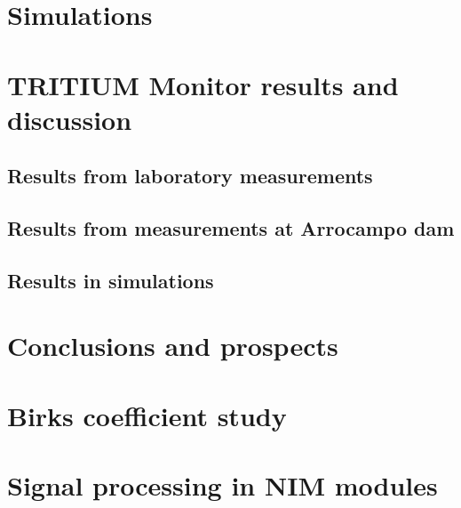 \documentclass[12pt,a4paper]{book}
\begin{document}
\chapter{Simulations}  \label{chap:Simulations}
\newpage
	
\chapter[Results and discussion]{TRITIUM Monitor results and discussion}\label{chap:Results}
	\section{Results from laboratory measurements}
	\newpage
		
	\section[Results in Arrocampo dam]{Results from measurements at Arrocampo dam}
	\newpage
	
	\section{Results in simulations}
	\newpage		

\chapter{Conclusions and prospects}  \label{chap:Conclusions}

\newpage


\appendix
\appendixpage
\noappendicestocpagenum
\addappheadtotoc

\chapter{Birks coefficient study}\label{App:BirksA}


\chapter{Signal processing in NIM modules}\label{App:ElectronicModulesNIM}

\end{document}
